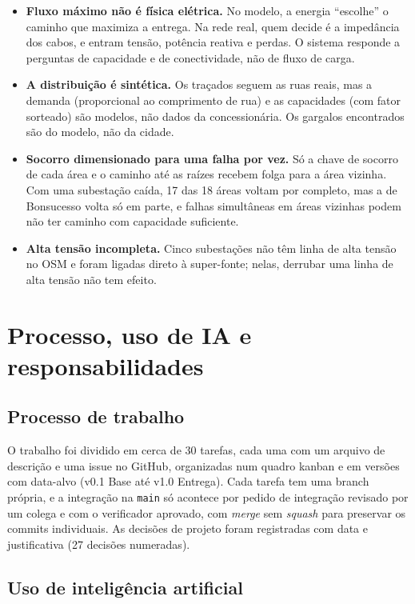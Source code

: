 \documentclass[12pt]{article}
\begin{document}
\begin{itemize}
  \item \textbf{Fluxo máximo não é física elétrica.} No modelo, a energia \textquotedblleft{}escolhe\textquotedblright{} o caminho que maximiza a entrega. Na rede real, quem decide é a impedância dos cabos, e entram tensão, potência reativa e perdas. O sistema responde a perguntas de capacidade e de conectividade, não de fluxo de carga.
  \item \textbf{A distribuição é sintética.} Os traçados seguem as ruas reais, mas a demanda (proporcional ao comprimento de rua) e as capacidades (com fator sorteado) são modelos, não dados da concessionária. Os gargalos encontrados são do modelo, não da cidade.
  \item \textbf{Socorro dimensionado para uma falha por vez.} Só a chave de socorro de cada área e o caminho até as raízes recebem folga para a área vizinha. Com uma subestação caída, 17 das 18 áreas voltam por completo, mas a de Bonsucesso volta só em parte, e falhas simultâneas em áreas vizinhas podem não ter caminho com capacidade suficiente.
  \item \textbf{Alta tensão incompleta.} Cinco subestações não têm linha de alta tensão no OSM e foram ligadas direto à super-fonte; nelas, derrubar uma linha de alta tensão não tem efeito.
\end{itemize}

\section{Processo, uso de IA e responsabilidades}
\label{sec:processo}

\subsection{Processo de trabalho}

O trabalho foi dividido em cerca de 30 tarefas, cada uma com um arquivo de descrição e uma issue no GitHub, organizadas num quadro kanban e em versões com data-alvo (v0.1 Base até v1.0 Entrega). Cada tarefa tem uma branch própria, e a integração na \texttt{main} só acontece por pedido de integração revisado por um colega e com o verificador aprovado, com \emph{merge} sem \emph{squash} para preservar os commits individuais. As decisões de projeto foram registradas com data e justificativa (27 decisões numeradas).

\subsection{Uso de inteligência artificial}
\end{document}
